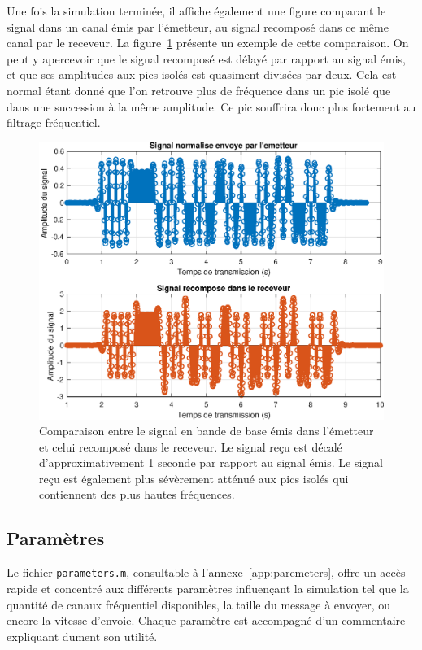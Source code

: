 \documentclass[10pt, oneside, a4paper]{article}
\begin{document}
Une fois la simulation terminée, il affiche également une figure comparant le signal dans un canal émis par l'émetteur, au signal recomposé dans ce même canal par le receveur.
La figure~\ref{fig:comparaison} présente un exemple de cette comparaison.
On peut y apercevoir que le signal recomposé est délayé par rapport au signal émis, et que ses amplitudes aux pics isolés est quasiment divisées par deux.
Cela est normal étant donné que l'on retrouve plus de fréquence dans un pic isolé que dans une succession à la même amplitude.
Ce pic souffrira donc plus fortement au filtrage fréquentiel.

\begin{figure}[p]
	\centering
	\includegraphics[height=0.45\textheight]{eps/comparaison.eps}
	\caption{Comparaison entre le signal en bande de base émis dans l'émetteur et celui
			 recomposé dans le receveur.
			 Le signal reçu est décalé d'approximativement 1 seconde par rapport au signal
			 émis.
			 Le signal reçu est également plus sévèrement atténué aux pics isolés qui
			 contiennent des plus hautes fréquences.}
	\label{fig:comparaison}
\end{figure}

\subsection{Paramètres}
Le fichier \texttt{parameters.m}, consultable à l'annexe~\ref{app:paremeters}, offre un accès rapide et concentré aux différents paramètres influençant la simulation tel que la quantité de canaux fréquentiel disponibles, la taille du message à envoyer, ou encore la vitesse d'envoie.
Chaque paramètre est accompagné d'un commentaire expliquant dument son utilité.
\end{document}
